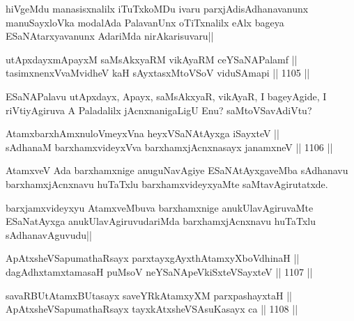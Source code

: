 \begin{artha}
hiVgeMdu manasisxnalilx iTuTxkoMDu ivaru parxjAdisAdhanavanunx manuSayxloVka modalAda PalavanUnx oTiTxnalilx eAlx bageya ESaNAtarxyavanunx AdariMda nirAkarisuvaru||
\end{artha}


\begin{shl}
utApxdayxmApayxM saMsAkxyaRM vikAyaRM ceYSaNAPalamf || \\
tasimxnenxVvaMvidheV kaH sAyxtasxMtoVSoV viduSAmapi ||  1105 ||  
\end{shl}

\begin{artha}
ESaNAPalavu utApxdayx, Apayx, saMsAkxyaR, vikAyaR, I bageyAgide, I riVtiyAgiruva A Paladalilx jAcnxnanigaLigU Enu? saMtoVSavAdiVtu?
\end{artha}


\begin{shl}
AtamxbarxhAmxnuloVmeyxVna heyxVSaNAtAyxga iSayxteV || \\
sAdhanaM barxhamxvideyxVva barxhamxjAcnxnasayx janamxneV ||  1106 ||  
\end{shl}

\begin{artha}
AtamxveV Ada barxhamxnige anuguNavAgiye ESaNAtAyxgaveMba sAdhanavu barxhamxjAcnxnavu huTaTxlu barxhamxvideyxyaMte saMtavAgirutatxde.	
\end{artha}


\begin{artha}
barxjamxvideyxyu AtamxveMbuva barxhamxnige anukUlavAgiruvaMte ESaNatAyxga anukUlavAgiruvudariMda barxhamxjAcnxnavu huTaTxlu sAdhanavAguvudu||
\end{artha}

\begin{shl}
ApAtxsheVSapumathaRsayx parxtayxgAyxthAtamxyXboVdhinaH || \\
dagAdhxtamxtamasaH puMsoV neYSaNA\s peVkiSxteVSayxteV ||  1107 ||  
\end{shl}
				
\begin{shl}
savaRBUtAtamxBUtasayx saveYRkAtamxyXM parxpashayxtaH || \\
ApAtxsheVSapumathaRsayx tayxkAtxsheVSAsuKasayx ca ||  1108 ||  
\end{shl}
				
